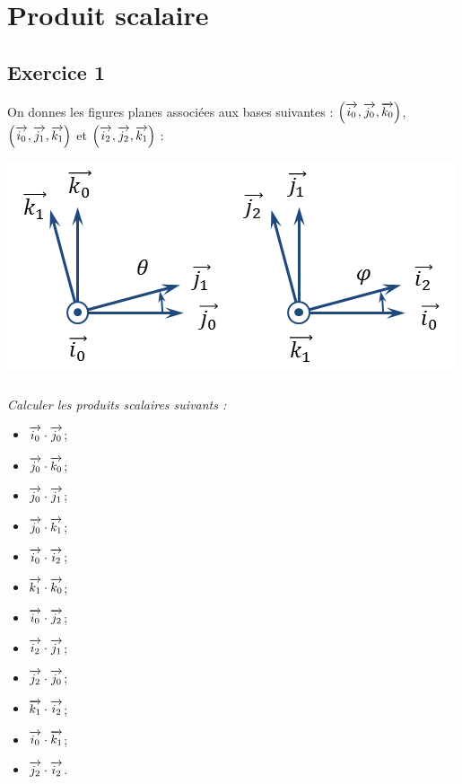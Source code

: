 \documentclass[10pt]{article}
\begin{document}






%
%

\section*{Produit scalaire}

\subsection*{Exercice 1}
On donnes les figures planes associées aux bases suivantes : $\left( \overrightarrow{i_0},\overrightarrow{j_0},\overrightarrow{k_0}\right)$, $\left( \overrightarrow{i_0},\overrightarrow{j_1},\overrightarrow{k_1}\right)$ et $\left( \overrightarrow{i_2},\overrightarrow{j_2},\overrightarrow{k_1}\right)$ :
\begin{center}
\includegraphics[width=.4\textwidth]{images/FiguresPlanes}
\end{center}

\subparagraph{}\textit{Calculer les produits scalaires suivants :}

\begin{multicols}{3}
\begin{itemize}
 \renewcommand{\labelitemi}{\tiny{$\blacksquare$}}
\item $\overrightarrow{i_0} \cdot \overrightarrow{j_0}$;
\item $\overrightarrow{j_0} \cdot \overrightarrow{k_0}$;
\item $\overrightarrow{j_0} \cdot \overrightarrow{j_1}$;
\item $\overrightarrow{j_0} \cdot \overrightarrow{k_1}$;
\item $\overrightarrow{i_0} \cdot \overrightarrow{i_2}$;
\item $\overrightarrow{k_1} \cdot \overrightarrow{k_0}$;
\item $\overrightarrow{i_0} \cdot \overrightarrow{j_2}$;
\item $\overrightarrow{i_2} \cdot \overrightarrow{j_1}$;
\item $\overrightarrow{j_2} \cdot \overrightarrow{j_0}$;
\item $\overrightarrow{k_1} \cdot \overrightarrow{i_2}$;
\item $\overrightarrow{i_0} \cdot \overrightarrow{k_1}$;
\item $\overrightarrow{j_2} \cdot \overrightarrow{i_2}$.
\end{itemize}
\end{multicols}
\end{document}
